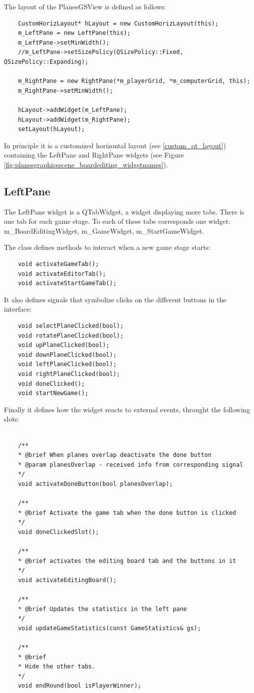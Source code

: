 The layout of the PlanesGSView is defined as follows:

\begin{lstlisting}
	CustomHorizLayout* hLayout = new CustomHorizLayout(this);
	m_LeftPane = new LeftPane(this);
	m_LeftPane->setMinWidth();
	//m_LeftPane->setSizePolicy(QSizePolicy::Fixed, QSizePolicy::Expanding);
	
	m_RightPane = new RightPane(*m_playerGrid, *m_computerGrid, this);
	m_RightPane->setMinWidth();
	
	hLayout->addWidget(m_LeftPane);
	hLayout->addWidget(m_RightPane);
	setLayout(hLayout);
\end{lstlisting} 

In principle it is a customized horizontal layout (see \ref{custom_qt_layout}) containing the LeftPane and RightPane widgets (see Figure \ref{fig:planesgraphicsscene_boardediting_widgetnames}). 

\subsection{LeftPane}
The LeftPane widget is a QTabWidget, a widget displaying more tabs. There is one tab for each game stage. To each of these tabs corresponds one widget: m\_BoardEditingWidget, m\_GameWidget, m\_StartGameWidget.

The class defines methods to interact when a new game stage starts:

\begin{lstlisting}
    void activateGameTab();
	void activateEditorTab();
	void activateStartGameTab();
\end{lstlisting}

It also defines signals that symbolize clicks on the different buttons in the interface:

\begin{lstlisting}
    void selectPlaneClicked(bool);
	void rotatePlaneClicked(bool);
	void upPlaneClicked(bool);
	void downPlaneClicked(bool);
	void leftPlaneClicked(bool);
	void rightPlaneClicked(bool);
	void doneClicked();
	void startNewGame();
\end{lstlisting}

Finally it defines how the widget reacts to external events, throught the following slots:

\begin{lstlisting}

	/**
	* @brief When planes overlap deactivate the done button
	* @param planesOverlap - received info from corresponding signal
	*/
	void activateDoneButton(bool planesOverlap);
	
	/**
	* @brief Activate the game tab when the done button is clicked
	*/
	void doneClickedSlot();
	
	/**
	* @brief activates the editing board tab and the buttons in it
	*/
	void activateEditingBoard();
	
	/**
	* @brief Updates the statistics in the left pane
	*/
	void updateGameStatistics(const GameStatistics& gs);
	
	/**
	* @brief
	* Hide the other tabs.
	*/
	void endRound(bool isPlayerWinner);

\end{lstlisting}

